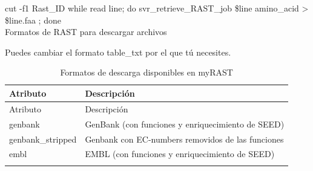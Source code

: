\documentclass[12pt,twoside]{reedthesis}
\begin{document}
  cut -f1 Rast\_ID \textbar{} while read line; do svr\_retrieve\_RAST\_job
  \$line amino\_acid \textgreater{} \$line.faa ; done\\
  Formatos de RAST para descargar archivos
  
  Puedes cambiar el formato table\_txt por el que tú necesites.
  
  \begin{longtable}[]{@{}ll@{}}
  \caption{Formatos de descarga disponibles en myRAST
  \label{tab:myrast}}\tabularnewline
  \toprule
  \begin{minipage}[b]{0.22\columnwidth}\raggedright\strut
  Atributo\strut
  \end{minipage} & \begin{minipage}[b]{0.72\columnwidth}\raggedright\strut
  Descripción\strut
  \end{minipage}\tabularnewline
  \midrule
  \endfirsthead
  \toprule
  \begin{minipage}[b]{0.22\columnwidth}\raggedright\strut
  Atributo\strut
  \end{minipage} & \begin{minipage}[b]{0.72\columnwidth}\raggedright\strut
  Descripción\strut
  \end{minipage}\tabularnewline
  \midrule
  \endhead
  \begin{minipage}[t]{0.22\columnwidth}\raggedright\strut
  genbank\strut
  \end{minipage} & \begin{minipage}[t]{0.72\columnwidth}\raggedright\strut
  GenBank (con funciones y enriquecimiento de SEED)\strut
  \end{minipage}\tabularnewline
  \begin{minipage}[t]{0.22\columnwidth}\raggedright\strut
  genbank\_stripped\strut
  \end{minipage} & \begin{minipage}[t]{0.72\columnwidth}\raggedright\strut
  Genbank con EC-numbers removidos de las funciones\strut
  \end{minipage}\tabularnewline
  \begin{minipage}[t]{0.22\columnwidth}\raggedright\strut
  embl\strut
  \end{minipage} & \begin{minipage}[t]{0.72\columnwidth}\raggedright\strut
  EMBL (con funciones y enriquecimiento de SEED)\strut
  \end{minipage}\tabularnewline
  \begin{minipage}[t]{0.22\columnwidth}\raggedright\strut

\end{minipage}
\end{longtable}
\end{document}
